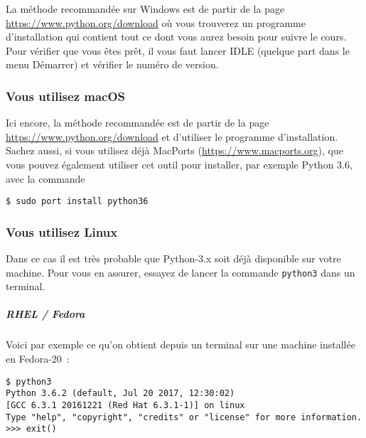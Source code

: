     La méthode recommandée sur Windows est de partir de la page
\href{https://www.python.org/download}{https://www.python.org/download} où vous trouverez un programme
d'installation qui contient tout ce dont vous aurez besoin pour suivre
le cours.\\

Pour vérifier que vous êtes prêt, il vous faut lancer IDLE (quelque part
dans le menu Démarrer) et vérifier le numéro de version.

    \hypertarget{vous-utilisez-macos}{%
\subsubsection{Vous utilisez macOS}\label{vous-utilisez-macos}}

    Ici encore, la méthode recommandée est de partir de la page
\href{https://www.python.org/download}{https://www.python.org/download} et d'utiliser le programme d'installation.\\

Sachez aussi, si vous utilisez déjà MacPorts (\href{https://www.macports.org}{https://www.macports.org}),
que vous pouvez également utiliser cet outil pour installer, par exemple
Python 3.6, avec la commande

    \begin{verbatim}
$ sudo port install python36
\end{verbatim}

    \hypertarget{vous-utilisez-linux}{%
\subsubsection{Vous utilisez Linux}\label{vous-utilisez-linux}}

    Dans ce cas il est très probable que Python-3.x soit déjà disponible sur
votre machine. Pour vous en assurer, essayez de lancer la commande
\texttt{python3} dans un terminal.

    \hypertarget{rhel-fedora}{%
\subparagraph{RHEL / Fedora}\label{rhel-fedora}}

    Voici par exemple ce qu'on obtient depuis un terminal sur une machine
installée en Fedora-20~:

    \begin{verbatim}
$ python3
Python 3.6.2 (default, Jul 20 2017, 12:30:02)
[GCC 6.3.1 20161221 (Red Hat 6.3.1-1)] on linux
Type "help", "copyright", "credits" or "license" for more information.
>>> exit()
\end{verbatim}

